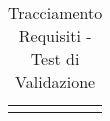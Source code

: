 \begin{center}
\begin{longtable}{|p{7cm}|p{7cm}|}
\bottomrule
\caption{Tracciamento Requisiti - Test di Validazione}
\label{tab:changelog}
\end{longtable}
\end{center}